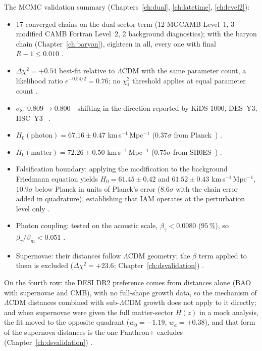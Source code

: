 The MCMC validation summary (Chapters~\ref{ch:dual}, \ref{ch:latetime}, \ref{ch:level2}):
\begin{itemize}
\item 17 converged chains on the dual-sector term (12 MGCAMB Level~1, 3 modified CAMB Fortran Level~2, 2 background diagnostics); with the baryon chain
(Chapter~\ref{ch:baryon}), eighteen in all, every one with final $R-1\le0.010$ \measured.
\item $\Delta\chi^2=+0.54$ best-fit relative to $\Lambda$CDM with the same parameter count, a likelihood ratio $e^{-0.54/2}=0.76$; no $\chi^2_1$ threshold
applies at equal parameter count \calc.
\item $\sigma_8$: $0.809\to0.800$---shifting in the direction reported by KiDS-1000, DES~Y3, HSC~Y3~\cite{Asgari2021,DESY3,HSCY3} \measured.
\item $H_0(\mathrm{photon})=67.16\pm0.47$ km\,s$^{-1}$\,Mpc$^{-1}$ ($0.37\sigma$ from Planck~\cite{Planck2018VI}) \measured.
\item $H_0(\mathrm{matter})=72.26\pm0.50$ km\,s$^{-1}$\,Mpc$^{-1}$ ($0.75\sigma$ from SH0ES~\cite{Riess2022}) \calc.
\item Falsification boundary: applying the modification to the background Friedmann equation yields $H_0=61.45\pm0.42$ and $61.52\pm0.43$
km\,s$^{-1}$\,Mpc$^{-1}$, $10.9\sigma$ below Planck in units of Planck's error ($8.6\sigma$ with the chain error added in quadrature), establishing that IAM
operates at the perturbation level only \measured.
\item Photon coupling: tested on the acoustic scale, $\beta_\gamma<0.0080$ ($95\,\%$), so $\beta_\gamma/\beta_m<0.051$ \calc.
\item Supernovae: their distances follow $\Lambda$CDM geometry; the $\beta$ term applied to them is excluded ($\Delta\chi^2=+23.6$;
Chapter~\ref{ch:dsvalidation}) \observed.
\end{itemize}
On the fourth row: the DESI DR2 preference comes from distances alone (BAO with supernovae and CMB), with no full-shape growth data, so the mechanism of
$\Lambda$CDM distances combined with sub-$\Lambda$CDM growth does not apply to it directly; and when supernovae were given the full matter-sector $H(z)$ in
a mock analysis, the fit moved to the opposite quadrant ($w_0=-1.19$, $w_a=+0.38$), and that form of the supernova distances is the one Pantheon+ excludes
(Chapter~\ref{ch:dsvalidation}) \openprob.
